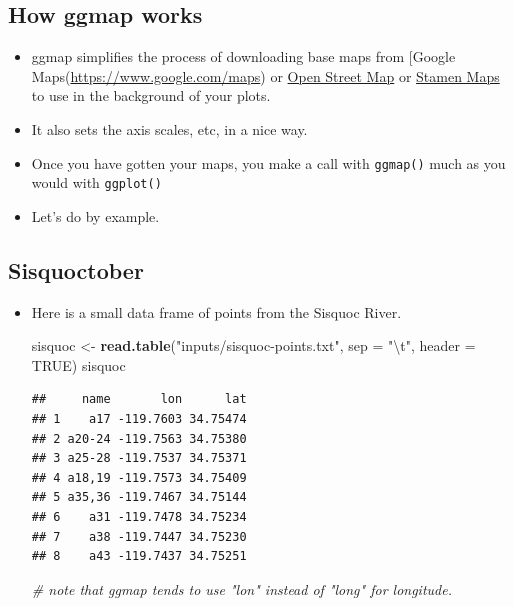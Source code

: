 \documentclass[]{book}
\newenvironment{Shaded}{\begin{snugshade}}{\end{snugshade}}
\newcommand{\KeywordTok}[1]{\textcolor[rgb]{0.13,0.29,0.53}{\textbf{{#1}}}}
\newcommand{\DataTypeTok}[1]{\textcolor[rgb]{0.13,0.29,0.53}{{#1}}}
\newcommand{\CharTok}[1]{\textcolor[rgb]{0.31,0.60,0.02}{{#1}}}
\newcommand{\StringTok}[1]{\textcolor[rgb]{0.31,0.60,0.02}{{#1}}}
\newcommand{\CommentTok}[1]{\textcolor[rgb]{0.56,0.35,0.01}{\textit{{#1}}}}
\newcommand{\OtherTok}[1]{\textcolor[rgb]{0.56,0.35,0.01}{{#1}}}
\newcommand{\NormalTok}[1]{{#1}}
\providecommand{\tightlist}{%
  \setlength{\itemsep}{0pt}\setlength{\parskip}{0pt}}
\theoremstyle{definition}
\theoremstyle{definition}
\theoremstyle{remark}
\begin{document}
\subsection{How ggmap works}\label{how-ggmap-works}

\begin{itemize}
\tightlist
\item
  ggmap simplifies the process of downloading base maps from {[}Google
  Maps(\url{https://www.google.com/maps}) or
  \href{https://www.openstreetmap.org/}{Open Street Map} or
  \href{http://maps.stamen.com/\#toner/12/37.7706/-122.3782}{Stamen
  Maps} to use in the background of your plots.
\item
  It also sets the axis scales, etc, in a nice way.\\
\item
  Once you have gotten your maps, you make a call with \texttt{ggmap()}
  much as you would with \texttt{ggplot()}
\item
  Let's do by example.
\end{itemize}

\subsection{Sisquoctober}\label{sisquoctober}

\begin{itemize}
\item
  Here is a small data frame of points from the Sisquoc River.

\begin{Shaded}
\begin{Highlighting}[]
\NormalTok{sisquoc <-}\StringTok{ }\KeywordTok{read.table}\NormalTok{(}\StringTok{"inputs/sisquoc-points.txt"}\NormalTok{, }\DataTypeTok{sep =} \StringTok{"}\CharTok{\textbackslash{}t}\StringTok{"}\NormalTok{, }\DataTypeTok{header =} \OtherTok{TRUE}\NormalTok{)}
\NormalTok{sisquoc}
\end{Highlighting}
\end{Shaded}

\begin{verbatim}
##     name       lon      lat
## 1    a17 -119.7603 34.75474
## 2 a20-24 -119.7563 34.75380
## 3 a25-28 -119.7537 34.75371
## 4 a18,19 -119.7573 34.75409
## 5 a35,36 -119.7467 34.75144
## 6    a31 -119.7478 34.75234
## 7    a38 -119.7447 34.75230
## 8    a43 -119.7437 34.75251
\end{verbatim}

\begin{Shaded}
\begin{Highlighting}[]
\CommentTok{# note that ggmap tends to use "lon" instead of "long" for longitude.}
\end{Highlighting}
\end{Shaded}
\end{itemize}
\end{document}
